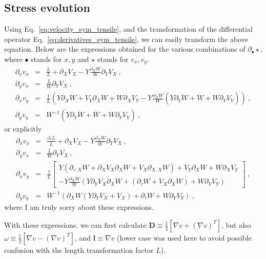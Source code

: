 \documentclass[12pt,a4paper]{article}
\begin{document}
\subsection{Stress evolution}\label{sse:stress}
Using Eq.~\eqref{eq:velocity_sym_tensile}, and the transformation of the differential operator Eq.~\eqref{eq:derivatives_sym_tensile}, we can easily transform the above equation. Below are the expressions obtained for the various combinations of $\partial_\bullet \star$, where $\bullet$ stands for $x,y$ and $\star$ stands for $v_x,v_y$.
\begin{eqnarray}\label{eq:velocity_derivatives}
  \partial_x v_x &=& \frac{\dot{L}}{L}+\partial_{X}V_{X}-Y\frac{\partial_{X}W}{W}\partial_{Y}V_{X} \ , \\
  \partial_y v_x &=& \frac{L}{W}\partial_Y V_X \ , \\
  \partial_x v_y &=& \frac{1}{L}\left(Y\partial_{X}\dot{W}+V_{Y}\partial_{X}W+W\partial_{X}V_{Y}-Y\frac{\partial_{X}W}{W}\left(Y\partial_{Y}\dot{W}+\dot{W}+W\partial_{Y}V_{Y}\right)\right) \ , \\
  \partial_y v_y &=& W^{-1}\left(Y\partial_{Y}\dot{W}+\dot{W}+W\partial_{Y}V_{Y}\right) \ ,
\end{eqnarray}
or explicitly
\begin{eqnarray}\label{eq:velocity_derivatives_exp}
  \partial_x v_x &=& \frac{\partial_{\tau}L}{L}+\partial_{X}V_{X}-Y\frac{\partial_{X}W}{W}\partial_{Y}V_{X}\ , \\
  \partial_y v_x &=& \frac{L}{W}\partial_Y V_X \ , \\
  \partial_x v_y &=& \frac{1}{L}\left[\begin{split}Y\left(\partial_{\tau,X}W+\partial_{X}V_{X}\partial_{X}W+V_{X}\partial_{X,X}W\right)+V_{Y}\partial_{X}W+W\partial_{X}V_{Y}\\
-Y\frac{\partial_{X}W}{W}\left(Y\partial_{Y}V_{X}\partial_{X}W+\left(\partial_{\tau}W+V_{X}\partial_{X}W\right)+W\partial_{Y}V_{Y}\right)
\end{split}
\right] \ , \\
  \partial_y v_y &=& W^{-1}\left(\partial_{X}W\left(Y\partial_{Y}V_{X}+V_{X}\right)+\partial_{\tau}W+W\partial_{Y}V_{Y}\right)\ ,
\end{eqnarray}
where I am truly sorry about these expressions.

With these expressions, we can first calculate $\bm{D}\equiv\frac{1}{2}\left[\nabla v + \left(\nabla v\right)^{T}\right]$, but also $\omega\equiv\frac{1}{2}\left[\nabla v - \left(\nabla v\right)^{T}\right]$, and $\bm{l}\equiv\nabla v$ (lower case was used here to avoid possible confusion with the length transformation factor $L$).
\end{document}
